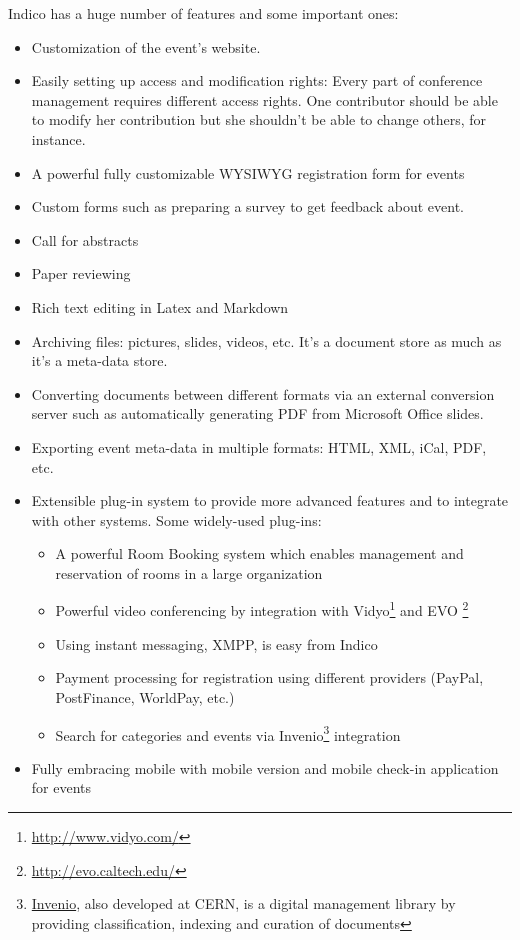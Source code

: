\par Indico has a huge number of features and some important ones:
\begin{itemize}
  \item Customization of the event's website.
  \item Easily setting up access and modification rights: Every part of conference management requires different access rights. One contributor should be able to modify her contribution but she shouldn't be able to change others, for instance.
  \item A powerful fully customizable WYSIWYG registration form for events
  \item Custom forms such as preparing a survey to get feedback about event.
  \item Call for abstracts
  \item Paper reviewing
  \item Rich text editing in Latex and Markdown
  \item Archiving files: pictures, slides, videos, etc. It's a document store as much as it's a meta-data store.
  \item Converting documents between different formats via an external conversion server such as automatically generating PDF from Microsoft Office slides.
  \item Exporting event meta-data in multiple formats: HTML, XML, iCal, PDF, etc.
  \item Extensible plug-in system to provide more advanced features and to integrate with other systems. Some widely-used plug-ins:
  \begin{itemize}
    \item A powerful Room Booking system which enables management and reservation of rooms in a large organization
    \item Powerful video conferencing by integration with Vidyo\footnote{\url{http://www.vidyo.com/}} and EVO \footnote{\url{http://evo.caltech.edu/}}
    \item Using instant messaging, XMPP, is easy from Indico
    \item Payment processing for registration using different providers (PayPal, PostFinance, WorldPay, etc.)
    \item Search for categories and events via Invenio\footnote{\href{https://invenio-software.org/}{Invenio}, also developed at \textsc{CERN}, is a digital management library by providing classification, indexing and curation of documents} integration
  \end{itemize}
  \item Fully embracing mobile with mobile version and mobile check-in application for events
\end{itemize}

